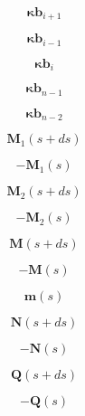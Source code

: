 \documentclass[a4paper,11pt,fleqn]{book}
\newcommand{\vect}[1]{\boldsymbol{#1}}
\begin{document}
\begin{equation}
\vect{\kappa b}_{i+1}
\end{equation}


\begin{equation}
\vect{\kappa b}_{i-1}
\end{equation}


\begin{equation}
\vect{\kappa b}_i
\end{equation}


\begin{equation}
\vect{\kappa b}_{n-1}
\end{equation}


\begin{equation}
\vect{\kappa b}_{n-2}
\end{equation}


\begin{equation}
\vect{M}_{1}(s+ds)
\end{equation}


\begin{equation}
-\vect{M}_{1}(s)
\end{equation}


\begin{equation}
\vect{M}_{2}(s+ds)
\end{equation}


\begin{equation}
-\vect{M}_{2}(s)
\end{equation}


\begin{equation}
\vect{M}(s+ds)
\end{equation}


\begin{equation}
-\vect{M}(s)
\end{equation}


\begin{equation}
\vect{m}(s)
\end{equation}


\begin{equation}
\vect{N}(s+ds)
\end{equation}


\begin{equation}
-\vect{N}(s)
\end{equation}


\begin{equation}
\vect{Q}(s+ds)
\end{equation}


\begin{equation}
-\vect{Q}(s)
\end{equation}
\end{document}
